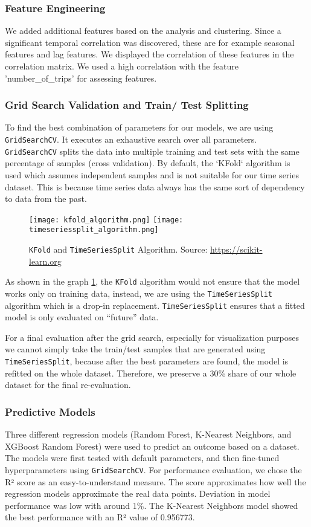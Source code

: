 \subsubsection{Feature Engineering}
We added additional features based on the analysis and clustering. Since a significant temporal correlation was discovered, these are for example seasonal features and lag features. We displayed the correlation of these features in the correlation matrix. We used a high correlation with the feature 'number\_of\_trips' for assessing features. 

\subsubsection{Grid Search Validation and Train/ Test Splitting}
To find the best combination of parameters for our models, we are using \texttt{GridSearchCV}.  It executes an exhaustive search over all parameters. \texttt{GridSearchCV} splits the data into multiple training and test sets with the same percentage of samples (cross validation). By default, the `KFold` algorithm is used which assumes independent samples and is not suitable for our time series dataset. This is because time series data always has the same sort of dependency to data from the past.

\begin{figure}[hbtp]
    \texttt{[image: kfold\_algorithm.png]}
    \hfill
    \texttt{[image: timeseriessplit\_algorithm.png]}
    \caption{\texttt{KFold} and \texttt{TimeSeriesSplit} Algorithm. Source: \url{https://scikit-learn.org}}
    \label{fig:cv}
\end{figure}
 
As shown in the graph \ref{fig:cv}, the \texttt{KFold} algorithm would not ensure that the model works only on training data, instead, we are using the \texttt{TimeSeriesSplit} algorithm which is a drop-in replacement. \texttt{TimeSeriesSplit} ensures that a fitted model is only evaluated on \enquote{future} data.

For a final evaluation after the grid search, especially for visualization purposes we cannot simply take the train/test samples that are generated using \texttt{TimeSeriesSplit}, because after the best parameters are found, the model is refitted on the whole dataset. Therefore, we preserve a 30\% share of our whole dataset for the final re-evaluation.

\subsubsection{Predictive Models}
Three different regression models (Random Forest, K-Nearest Neighbors, and XGBoost Random Forest) were used to predict an outcome based on a dataset. The models were first tested with default parameters, and then fine-tuned hyperparameters using \texttt{GridSearchCV}. For performance evaluation, we chose the R² score as an easy-to-understand measure. The score approximates how well the regression models approximate the real data points. Deviation in model performance was low with around 1\%. The K-Nearest Neighbors model showed the best performance with an R² value of 0.956773. 

